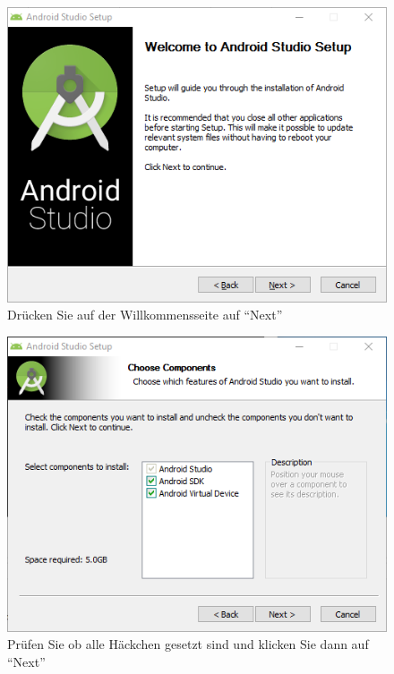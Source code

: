 \documentclass[a4paper,10pt,xetex]{article}
\begin{document}
\begin{figure}
  \centering
  \includegraphics[width=\textwidth]{Installation/1-1}
  \caption{Drücken Sie auf der Willkommensseite auf ``Next''}
\end{figure}

\begin{figure}
  \centering
  \includegraphics[width=\textwidth]{Installation/1-2}
  \caption{Prüfen Sie ob alle Häckchen gesetzt sind und klicken Sie dann auf ``Next''}
\end{figure}
\end{document}
